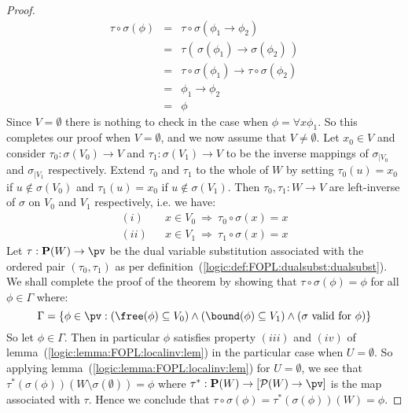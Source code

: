 \begin{proof}
\begin{eqnarray*}
    \tau\circ\sigma(\phi)&=&\tau\circ\sigma(\phi_{1}\to\phi_{2})\\
    &=&\tau(\,\sigma(\phi_{1})\to\sigma(\phi_{2})\,)\\
    &=&\tau\circ\sigma(\phi_{1})\to\tau\circ\sigma(\phi_{2})\\
    &=&\phi_{1}\to\phi_{2}\\
    &=&\phi
    \end{eqnarray*}
Since $V=\emptyset$ there is nothing to check in the case when
$\phi=\forall x\phi_{1}$. So this completes our proof when
$V=\emptyset$, and we now assume that $V\neq\emptyset$. Let
$x_{0}\in V$ and consider $\tau_{0}:\sigma(V_{0})\to V$ and
$\tau_{1}:\sigma(V_{1})\to V$ to be the inverse mappings of
$\sigma_{|V_{0}}$ and $\sigma_{|V_{1}}$ respectively. Extend
$\tau_{0}$ and $\tau_{1}$ to the whole of $W$ by setting
$\tau_{0}(u)=x_{0}$ if $u\not\in\sigma(V_{0})$ and
$\tau_{1}(u)=x_{0}$ if $u\not\in\sigma(V_{1})$. Then $\tau_{0},
\tau_{1}:W\to V$ are left-inverse of $\sigma$ on $V_{0}$ and $V_{1}$
respectively, i.e. we have:
    \begin{eqnarray*}
    (i)&&x\in V_{0}\ \Rightarrow\ \tau_{0}\circ\sigma(x)=x\\
    (ii)&&x\in V_{1}\ \Rightarrow\ \tau_{1}\circ\sigma(x)=x
    \end{eqnarray*}
Let $\tau:{\bf P}(W)\to\pv$ be the dual variable substitution
associated with the ordered pair $(\tau_{0},\tau_{1})$ as per
definition~(\ref{logic:def:FOPL:dualsubst:dualsubst}). We shall
complete the proof of the theorem by showing that
$\tau\circ\sigma(\phi)=\phi$ for all $\phi\in\Gamma$ where:
    \[
    \Gamma=\{\phi\in\pv:(\free(\phi)\subseteq
    V_{0})\land(\bound(\phi)\subseteq V_{1})\land(\mbox{$\sigma$
    valid for $\phi$})\}
    \]
So let $\phi\in\Gamma$. Then in particular $\phi$ satisfies property
$(iii)$ and $(iv)$ of lemma~(\ref{logic:lemma:FOPL:localinv:lem}) in
the particular case when $U=\emptyset$. So applying
lemma~(\ref{logic:lemma:FOPL:localinv:lem}) for $U=\emptyset$, we
see that $\tau^{*}(\sigma(\phi))(W\setminus\sigma(\emptyset))=\phi$
where $\tau^{*}:{\bf P}(W)\to[{\cal P}(W)\to\pv]$ is the map
associated with $\tau$. Hence we conclude that
$\tau\circ\sigma(\phi)=\tau^{*}(\sigma(\phi))(W)=\phi$.
\end{proof}
